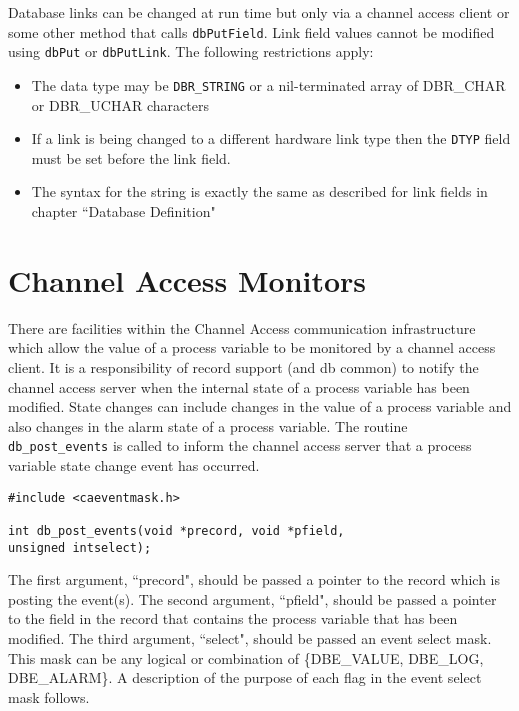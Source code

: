 Database links can be changed at run time but only via a channel access client or some other method that calls \verb|dbPutField|.
Link field values cannot be modified using \verb|dbPut| or \verb|dbPutLink|.
The following restrictions apply:

\begin{itemize}
\item The data type may be \verb|DBR_STRING| or a nil-terminated array of DBR\_CHAR or DBR\_UCHAR characters

\item If a link is being changed to a different hardware link type then the \verb|DTYP| field must be set before the link field.

\item The syntax for the string is exactly the same as described for link fields in chapter ``Database Definition"

\end{itemize}

\section{Channel Access Monitors}

There are facilities within the Channel Access communication infrastructure which allow the value of a process variable to be monitored by a channel access client.
It is a responsibility of record support (and db common) to notify the channel access server when the internal state of a process variable has been modified.
State changes can include changes in the value of a process variable and also changes in the alarm state of a process variable.
The routine \verb|db_post_events| is called to inform the channel access server that a process variable state change event has occurred.

\begin{verbatim}
#include <caeventmask.h>

int db_post_events(void *precord, void *pfield,
unsigned intselect);
\end{verbatim}

The first argument, ``precord", should be passed a pointer to the record which is posting the event(s).
The second argument, ``pfield", should be passed a pointer to the field in the record that contains the process variable that has been modified.
The third argument, ``select", should be passed an event select mask.
This mask can be any logical or combination of \{DBE\_VALUE, DBE\_LOG, DBE\_ALARM\}.
A description of the purpose of each flag in the event select mask follows.

